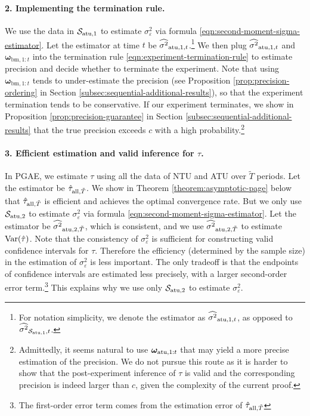 \paragraph{2. Implementing the termination rule.} We use the data in $\mathcal{S}_{\mathrm{atu},1}$ to estimate $\sigma^2_\varepsilon$ via formula \eqref{eqn:second-moment-sigma-estimator}. Let the estimator at time $t$ be $\widehat{\sigma^2}_{\mathrm{atu},1,t}$.\footnote{For notation simplicity, we denote the estimator as $\widehat{\sigma^2}_{\mathrm{atu},1,t}$, as opposed to $\widehat{\sigma^2}_{\mathcal{S}_{\mathrm{atu},1},t}$.}
We then plug $\widehat{\sigma^2}_{\mathrm{atu},1,t}$ and $\bm{\omega}_{\mathrm{bm},1:t}$ into the termination rule \eqref{eqn:experiment-termination-rule} to estimate precision and decide whether to terminate the experiment. Note that using $\bm{\omega}_{\mathrm{bm},1:t}$ tends to under-estimate the precision (see Proposition \ref{prop:precision-ordering} in Section \ref{subsec:sequential-additional-results}), so that the experiment termination tends to be conservative. If our experiment terminates, we show in Proposition \ref{prop:precision-guarantee} in Section \ref{subsec:sequential-additional-results} that the true precision exceeds $c$ with a high probability.\footnote{Admittedly, it seems natural to use $\bm{\omega}_{\mathrm{atu},1:t}$ that may yield a more precise estimation of the precision. We do not pursue this route as it is harder to show that the post-experiment inference of $\tau$ is valid and the corresponding precision is indeed larger than $c$, given the complexity of the current proof.} 



\paragraph{3. Efficient estimation and valid inference for $\tau$.} In PGAE, we estimate 
$\tau$ using all the data of NTU and ATU over $\tilde{T}$ periods. Let the estimator be $\hat{\tau}_{\mathrm{all},\tilde T}$. We show in Theorem \ref{theorem:asymptotic-page} below that $\hat{\tau}_{\mathrm{all},\tilde T}$ is efficient and achieves the optimal convergence rate. But we only use $\mathcal{S}_{\mathrm{atu},2}$ to estimate $\sigma^2_\varepsilon$ via formula \eqref{eqn:second-moment-sigma-estimator}. Let the estimator be $\widehat{\sigma^2}_{\mathrm{atu},2,\tilde T}$, which is consistent, and we use $\widehat{\sigma^2}_{\mathrm{atu},2,\tilde T}$ to estimate $\mathrm{Var}(\hat{\tau})$.
Note that the consistency of $\sigma^2_\varepsilon$ is sufficient for constructing valid confidence intervals for $\tau$. Therefore the efficiency (determined by the sample size) in the estimation of $\sigma^2_\varepsilon$ is less important. The only tradeoff is that the endpoints of confidence intervals are estimated less precisely, with a larger second-order error term.\footnote{The first-order error term comes from the estimation error of $\hat{\tau}_{\mathrm{all},\tilde T}$} This explains why we use only $\mathcal{S}_{\mathrm{atu},2}$ to estimate $\sigma^2_\varepsilon$.

